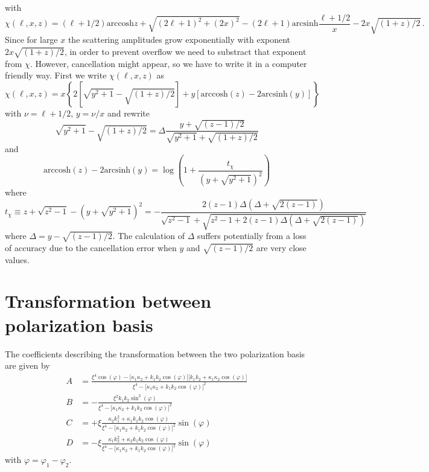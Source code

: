 \documentclass[onecolumn%
              ,superscriptaddress%
              ,aps%
              ,pra]{revtex4}
\begin{document}
with
\begin{equation}
\chi(\ell,x,z) = (\ell+1/2)\mathrm{arccosh}z + \sqrt{(2\ell+1)^2 + (2 x)^2} - (2\ell+1) \mathrm{arcsinh} \frac{\ell+1/2}{x} - 2 x \sqrt{(1+z)/2}\,.
\end{equation}
Since for large $x$ the scattering amplitudes grow exponentially with exponent $2 x \sqrt{(1+z)/2}$, in order to prevent overflow we need to substract that exponent from $\chi$. However, cancellation might appear, so we have to write it in a computer friendly way. First we write $\chi(\ell, x, z)$ as
\begin{equation}
\chi(\ell,x,z) = x\left\lbrace2\left[\sqrt{y^2+1} - \sqrt{(1+z)/2}\right] + y\left[\mathrm{arccosh}(z) - 2\mathrm{arcsinh} (y)\right]\right\rbrace
\end{equation}
with $\nu = \ell+1/2$, $y = \nu/x$ and rewrite
\begin{equation}
\sqrt{y^2 + 1} - \sqrt{(1+z)/2} = \Delta \frac{y+\sqrt{(z-1)/2}}{\sqrt{y^2+1} + \sqrt{(1+z)/2}}
\end{equation}
and
\begin{equation}
\mathrm{arccosh}(z) - 2\mathrm{arcsinh} (y) = \log\left(1+ \frac{t_\chi}{(y+\sqrt{y^2+1})^2}\right)
\end{equation}
where
\begin{equation}
t_\chi \equiv z+\sqrt{z^2-1}-(y+\sqrt{y^2+1})^2 = -  \frac{2(z-1)\Delta(\Delta + \sqrt{2(z-1)})}{\sqrt{z^2-1} + \sqrt{z^2-1+2(z-1)\Delta(\Delta + \sqrt{2(z-1)})}}
\end{equation}
where $\Delta = y-\sqrt{(z-1)/2}$. The calculation of $\Delta$ suffers potentially from a loss of accuracy due to the cancellation error when $y$ and $\sqrt{(z-1)/2}$ are very close values.

\section{Transformation between polarization basis}

The coefficients describing the transformation between the two polarization basis are given by
\begin{equation}
\begin{aligned}
A &=
\frac{\xi^4\cos(\varphi)-\big[\kappa_1\kappa_2+k_1k_2\cos(\varphi)\big]
\big[k_1k_2+\kappa_1\kappa_2\cos(\varphi)\big]}
{\xi^4-\big[\kappa_1\kappa_2+k_1k_2\cos(\varphi)\big]^2} \\
B & = -\frac{\xi^2 k_1 k_2\sin^2(\varphi)}
{\xi^4-\big[\kappa_1\kappa_2+k_1k_2\cos(\varphi)\big]^2} \\
C & = +\xi\frac{\kappa_2k_1^2+\kappa_1k_1k_2\cos(\varphi)}
{\xi^4-\big[\kappa_1\kappa_2+k_1k_2\cos(\varphi)\big]^2}\sin(\varphi) \\
D & = -\xi\frac{\kappa_1k_2^2+\kappa_2k_1k_2\cos(\varphi)}
{\xi^4-\big[\kappa_1\kappa_2+k_1k_2\cos(\varphi)\big]^2}\sin(\varphi)
\end{aligned}
\end{equation}
with $\varphi = \varphi_1 - \varphi_2$.
\end{document}
